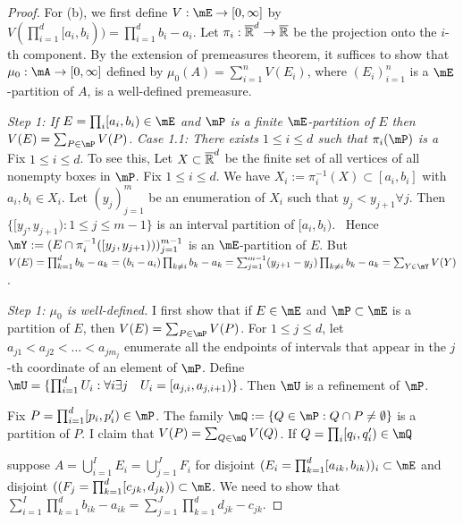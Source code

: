 \documentclass{article}
\begin{document}
\begin{proof}
For (b), we first define $V : \mE \to [0, \infty]$ by $V(\prod_{i=1}^d [a_i, b_i)) = \prod_{i=1}^d b_i - a_i$. Let $\pi_i: \overline{\mathbb{R}}^d \to \overline {\mathbb{R}}$ be the projection onto the $i$-th component. By the extension of premeasures theorem, it suffices to show that $\mu_0: \mA \to [0, \infty]$ defined by $\mu_0(A) = \sum_{i=1}^n V(E_i)$, where $(E_i)_{i=1}^n$ is a $\mE$-partition of $A$, is a well-defined premeasure.


\emph{Step 1: If $E = \prod_i [a_i, b_i) \in \mE$ and $\mP$ is a finite $\mE$-partition of $E$ then $V(E) = \sum_{P \in \mP} V(P)$.}
\emph{Case 1.1: There exists $1 \le i \le d$ such that $\pi_i(\mP)$ is a }
Fix $1 \le i \le d$.
To see this, Let $X \subset \overline{\mathbb{R}}^d$ be the finite set of all vertices of all nonempty boxes in $\mP$. Fix $1 \le i \le d$. We have $X_i := \pi_i^{-1} (X) \subset [a_i, b_i]$ with $a_i, b_i \in X_i$. Let $(y_j)_{j=1}^m$ be an enumeration of $X_i$ such that $y_j < y_{j+1} \forall j$. Then $\{ [y_j, y_{j+1}) : 1 \le j \le m-1 \}$ is an interval partition of $[a_i, b_i)$. \
Hence $\mY :=(E \cap \pi_i^{-1}([y_j, y_{j+1})))_{j=1}^{m-1}$ is an $\mE$-partition of $E$. But $V(E) = \prod_{k=1}^d b_k - a_k = (b_i - a_i) \prod_{k \neq i} b_k - a_k = \sum_{j=1}^{m-1} (y_{j+1} - y_j) \prod_{k \neq i} b_k - a_k = \sum_{Y \in \mY} V(Y)$.


\emph{Step 1: $\mu_0$ is well-defined.} I first show that if $E \in \mE$ and $\mP \subset \mE$ is a partition of $E$, then $V(E) = \sum_{P \in \mP} V(P)$.
For $1 \le j \le d$, let $a_{j1} < a_{j2} < \ldots < a_{j m_j}$ enumerate all the endpoints of intervals that appear in the $j$-th coordinate of an element of $\mP$.  Define $\mU = \{ \prod_{i=1}^d U_i : \forall i \exists j \quad U_i = [a_{j,i}, a_{j,i+1}) \}$.  Then $\mU$ is a refinement of $\mP$.

Fix $P = \prod_{i=1}^d [p_i, p_i') \in \mP$.  The family $\mQ := \{Q \in \mP : Q \cap P \neq \emptyset \}$ is a partition of $P$. I claim that $V(P) = \sum_{Q \in \mQ} V(Q)$. If $Q = \prod_i [q_i, q_i') \in \mQ$

  



suppose $A = \bigcup_{i=1}^I E_i = \bigcup_{j=1}^J F_i$ for disjoint $(E_i = \prod_{k=1}^d [a_{ik}, b_{ik}))_i \subset\mE$ and disjoint $((F_j = \prod_{k=1}^d [c_{jk}, d_{jk})) \subset \mE$. We need to show that $\sum_{i=1}^I \prod_{k=1}^d b_{ik} - a_{ik} = \sum_{j=1}^J \prod_{k=1}^d d_{jk} - c_{jk}$.


\end{proof}
\end{document}
